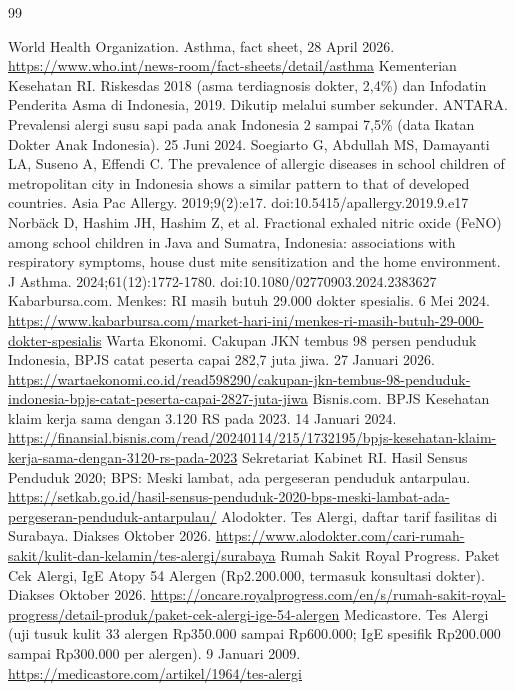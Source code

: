 \documentclass[11pt,a4paper]{article}
\begin{document}
\begin{thebibliography}{99}\small\raggedright
\setlength{\itemsep}{2pt}
 World Health Organization. Asthma, fact sheet, 28 April 2026. \url{https://www.who.int/news-room/fact-sheets/detail/asthma}
 Kementerian Kesehatan RI. Riskesdas 2018 (asma terdiagnosis dokter, 2,4\%) dan Infodatin Penderita Asma di Indonesia, 2019. Dikutip melalui sumber sekunder.
 ANTARA. Prevalensi alergi susu sapi pada anak Indonesia 2 sampai 7,5\% (data Ikatan Dokter Anak Indonesia). 25 Juni 2024.
 Soegiarto G, Abdullah MS, Damayanti LA, Suseno A, Effendi C. The prevalence of allergic diseases in school children of metropolitan city in Indonesia shows a similar pattern to that of developed countries. Asia Pac Allergy. 2019;9(2):e17. doi:10.5415/apallergy.2019.9.e17
 Norb\"ack D, Hashim JH, Hashim Z, et al. Fractional exhaled nitric oxide (FeNO) among school children in Java and Sumatra, Indonesia: associations with respiratory symptoms, house dust mite sensitization and the home environment. J Asthma. 2024;61(12):1772-1780. doi:10.1080/02770903.2024.2383627
 Kabarbursa.com. Menkes: RI masih butuh 29.000 dokter spesialis. 6 Mei 2024. \url{https://www.kabarbursa.com/market-hari-ini/menkes-ri-masih-butuh-29-000-dokter-spesialis}
 Warta Ekonomi. Cakupan JKN tembus 98 persen penduduk Indonesia, BPJS catat peserta capai 282,7 juta jiwa. 27 Januari 2026. \url{https://wartaekonomi.co.id/read598290/cakupan-jkn-tembus-98-penduduk-indonesia-bpjs-catat-peserta-capai-2827-juta-jiwa}
 Bisnis.com. BPJS Kesehatan klaim kerja sama dengan 3.120 RS pada 2023. 14 Januari 2024. \url{https://finansial.bisnis.com/read/20240114/215/1732195/bpjs-kesehatan-klaim-kerja-sama-dengan-3120-rs-pada-2023}
 Sekretariat Kabinet RI. Hasil Sensus Penduduk 2020; BPS: Meski lambat, ada pergeseran penduduk antarpulau. \url{https://setkab.go.id/hasil-sensus-penduduk-2020-bps-meski-lambat-ada-pergeseran-penduduk-antarpulau/}
 Alodokter. Tes Alergi, daftar tarif fasilitas di Surabaya. Diakses Oktober 2026. \url{https://www.alodokter.com/cari-rumah-sakit/kulit-dan-kelamin/tes-alergi/surabaya}
 Rumah Sakit Royal Progress. Paket Cek Alergi, IgE Atopy 54 Alergen (Rp2.200.000, termasuk konsultasi dokter). Diakses Oktober 2026. \url{https://oncare.royalprogress.com/en/s/rumah-sakit-royal-progress/detail-produk/paket-cek-alergi-ige-54-alergen}
 Medicastore. Tes Alergi (uji tusuk kulit 33 alergen Rp350.000 sampai Rp600.000; IgE spesifik Rp200.000 sampai Rp300.000 per alergen). 9 Januari 2009. \url{https://medicastore.com/artikel/1964/tes-alergi}

\end{thebibliography}
\end{document}
